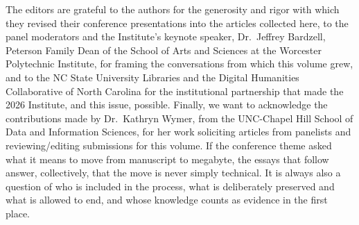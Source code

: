 \documentclass[final]{anthology-ch}  %
\begin{document}
The editors are grateful to the authors for the generosity and rigor with which they revised their conference presentations into the articles collected here, to the panel moderators and the Institute's keynote speaker, Dr.\ Jeffrey Bardzell, Peterson Family Dean of the School of Arts and Sciences at the Worcester Polytechnic Institute, for framing the conversations from which this volume grew, and to the NC State University Libraries and the Digital Humanities Collaborative of North Carolina for the institutional partnership that made the 2026 Institute, and this issue, possible. Finally, we want to acknowledge the contributions made by Dr.\ Kathryn Wymer, from the UNC-Chapel Hill School of Data and Information Sciences, for her work soliciting articles from panelists and reviewing/editing submissions for this volume. If the conference theme asked what it means to move from manuscript to megabyte, the essays that follow answer, collectively, that the move is never simply technical. It is always also a question of who is included in the process, what is deliberately preserved and what is allowed to end, and whose knowledge counts as evidence in the first place.
\end{document}
